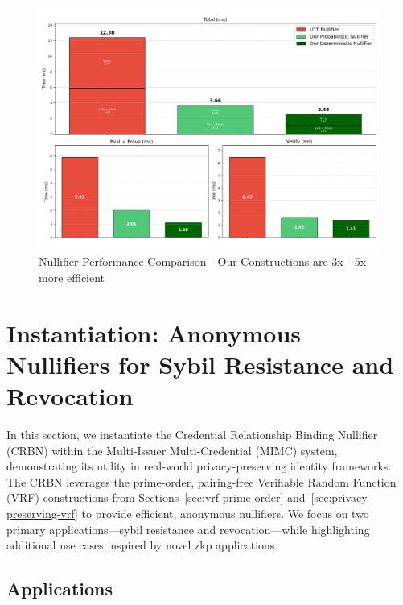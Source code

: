 \begin{figure}[!htb]
    \centering
    \includegraphics[width=1\linewidth]{figures/chap4_nullifier_comparisons.png}
    \caption[Our Nullifier Constructions are 3x - 5x more efficient]{Nullifier Performance Comparison - Our Constructions are 3x - 5x more efficient}
    \label{fig:nullifiers_figure}
\end{figure}

















\section{Instantiation: Anonymous Nullifiers for Sybil Resistance and Revocation}\label{sec-vrf-instantiation}

In this section, we instantiate the Credential Relationship Binding Nullifier (CRBN) within the Multi-Issuer Multi-Credential (MIMC) system, demonstrating its utility in real-world privacy-preserving identity frameworks. The CRBN leverages the prime-order, pairing-free Verifiable Random Function (VRF) constructions from Sections~\ref{sec:vrf-prime-order} and~\ref{sec:privacy-preserving-vrf} to provide efficient, anonymous nullifiers. We focus on two primary applications—sybil resistance and revocation—while highlighting additional use cases inspired by novel zkp applications. 

\subsection{Applications}\label{subsec:applications}

